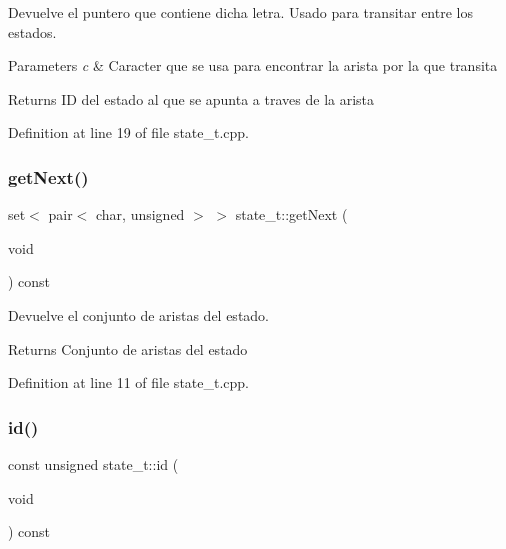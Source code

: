 Devuelve el puntero que contiene dicha letra. Usado para transitar entre los estados. 


\begin{DoxyParams}{Parameters}
{\em c} & Caracter que se usa para encontrar la arista por la que transita \\
\hline
\end{DoxyParams}
\begin{DoxyReturn}{Returns}
ID del estado al que se apunta a traves de la arista 
\end{DoxyReturn}


Definition at line 19 of file state\+\_\+t.\+cpp.

\mbox{\label{classstate__t_a2ab5aaf45f890ade849fc87a0da80f6a}} 
\subsubsection{\texorpdfstring{get\+Next()}{getNext()}}
{\footnotesize\ttfamily set$<$ pair$<$ char, unsigned $>$ $>$ state\+\_\+t\+::get\+Next (\begin{DoxyParamCaption}\item[{void}]{ }\end{DoxyParamCaption}) const}



Devuelve el conjunto de aristas del estado. 

\begin{DoxyReturn}{Returns}
Conjunto de aristas del estado 
\end{DoxyReturn}


Definition at line 11 of file state\+\_\+t.\+cpp.

\mbox{\label{classstate__t_ade808c541a78e337c021020842e3c21d}} 
\subsubsection{\texorpdfstring{id()}{id()}}
{\footnotesize\ttfamily const unsigned state\+\_\+t\+::id (\begin{DoxyParamCaption}\item[{void}]{ }\end{DoxyParamCaption}) const}



